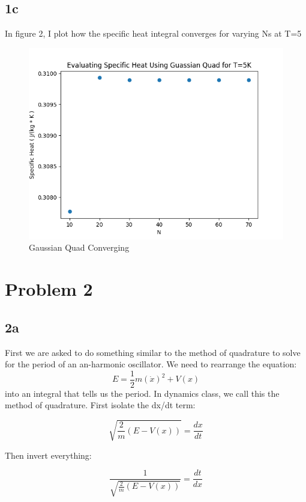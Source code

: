 \documentclass{article}
\begin{document}
\subsection{1c}
In figure 2, I  plot how the specific heat integral converges for varying Ns at T=5
\begin{figure}[h!]
    \centering
    \includegraphics[width=.8\linewidth]{ps-4-1c.png}
    \caption{Gaussian Quad Converging}
    \label{fig:enter-label}
\end{figure}

\section{Problem 2}
\subsection{2a}
First we are asked to do something similar to the method of quadrature to solve for the period of an an-harmonic oscillator. We need to rearrange the equation:
\begin{equation}
    E=\frac{1}{2}m(\dot{x})^2 + V(x)
\end{equation}
into an integral that tells us the period. In dynamics class, we call this the method of quadrature. First isolate the dx/dt term:


\begin{equation}
   \sqrt{ \frac{2}{m}(E-V(x)) }=\frac{dx}{dt}
\end{equation}

Then invert everything:

\begin{equation}
   \frac{1}{\sqrt{ \frac{2}{m}(E-V(x)) }}=\frac{dt}{dx}
\end{equation}
\end{document}
